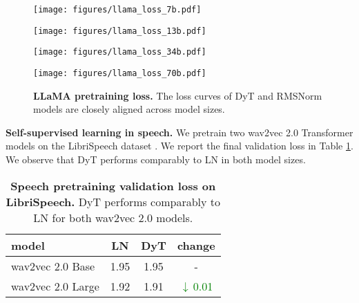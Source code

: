 \documentclass[]{fairmeta}
\newcommand{\tablestyle}[2]{\setlength{\tabcolsep}{#1}\renewcommand{\arraystretch}{#2}\centering\footnotesize}
\renewcommand{\paragraph}[1]{\vspace{1.25mm}\noindent\textbf{#1}}
\newcommand{\betterinv}[1]{\textcolor{green}{$\downarrow\,$#1}}
\begin{document}
\begin{figure*}[t]
\vspace{-0.5in}
\centering
\begin{minipage}{0.49\textwidth}
\hspace*{-0.25cm}
\texttt{[image: figures/llama\_loss\_7b.pdf]}
\end{minipage}
\hfill
\begin{minipage}{0.49\textwidth}
\hspace*{-0.6cm}
  \texttt{[image: figures/llama\_loss\_13b.pdf]}
\end{minipage}
\vfill
\begin{minipage}{0.49\textwidth}
\vspace*{-0.1cm}
\hspace*{-0.25cm}
\texttt{[image: figures/llama\_loss\_34b.pdf]}
\end{minipage}
\hfill
\begin{minipage}{0.49\textwidth}
\vspace*{-0.1cm}
\hspace*{-0.6cm}
\texttt{[image: figures/llama\_loss\_70b.pdf]}
\end{minipage}
\caption{\textbf{LLaMA pretraining loss.} The loss curves of DyT and RMSNorm models are closely aligned across model sizes.}
\label{figure:llama_curve}
\end{figure*}



\vskip -0.1in
\paragraph{Self-supervised learning in speech.}
We pretrain two wav2vec 2.0 Transformer models \citep{baevski2020wav2vec} on the LibriSpeech dataset \citep{panayotov2015librispeech}.
We report the final validation loss in Table \ref{table:wav2vec2}. We observe that DyT performs comparably to LN in both model sizes.

\begin{table}[h!]
\centering
\tablestyle{7pt}{1.15}
\begin{tabular}{lccc}
\toprule
model & LN & DyT & change   \\
\midrule
wav2vec 2.0 Base &  1.95 & 1.95 & - \\
wav2vec 2.0 Large & 1.92 & 1.91 & \betterinv{0.01}  \\
\midrule
\end{tabular}
\caption{\textbf{Speech pretraining validation loss on LibriSpeech.} DyT performs comparably to LN for both wav2vec 2.0 models.}
\label{table:wav2vec2}
\end{table}
\end{document}
